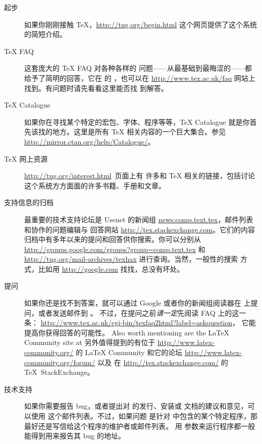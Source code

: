 \documentclass{article}
\begin{document}
\begin{description}
\item [起步] 如果你刚刚接触 \TeX，\url{http://tug.org/begin.html}
这个网页提供了这个系统的简短介绍。

\item [\TeX{} FAQ] 这套庞大的 \TeX{} FAQ 对各种各样的
问题——从最基础到最晦涩的——都给予了简明的回答，它在 \TL{} 的
，也可以在
\url{http://www.tex.ac.uk/faq} 网站上找到。有问题时请先看看这里能否找
到解答。

\item [\TeX{} Catalogue] 如果你在寻找某个特定的宏包、字体、程序等等，\TeX{}
Catalogue 就是你首先该找的地方。这里是所有 \TeX{} 相关内容的一个巨大集合。参见
\url{http://mirror.ctan.org/help/Catalogue/}。

\item [\TeX{} 网上资源] \url{http://tug.org/interest.html}~页面上有
许多和 \TeX{} 相关的链接，包括讨论这个系统方方面面的许多书籍、手册和文章。

\item [支持信息的归档] 最重要的技术支持论坛是 Usenet 的新闻组
\url{news:comp.text.tex}，邮件列表  和协作的问题编辑与
回答网站 \url{http://tex.stackexchange.com}。它们的内容
归档中有多年以来的提问和回答供你搜索。你可以分别从 \\
\url{http://groups.google.com/groups?group=comp.text.tex} 和 \\
\url{http://tug.org/mail-archives/texhax} 进行查询。当然，一般性的搜索
方式，比如用 \url{http://google.com} 找找，总没有坏处。

\item [提问] 如果你还是找不到答案，就可以通过 Google 或者你的新闻组阅读器在
 上提问，或者发送邮件到 。
不过，在提问之前\emph{请一定}先阅读 FAQ 上的这一条：
\url{http://www.tex.ac.uk/cgi-bin/texfaq2html?label=askquestion}，
它能提高你获得回答的可能性。
Also worth mentioning are the \LaTeX{} Community site at
另外值得提到的有位于 \url{http://www.latex-community.org/} 的
\LaTeX{} Community 和它的论坛
\url{http://www.latex-community.org/forum/} 以及
在 \url{http://tex.stackexchange.com/} 的 \TeX\ StackExchange。

\item [\TL{} 技术支持] 如果你需要报告 bug，或者提出对 \TL{} 的发行、安装或
文档的建议和意见，可以使用  这个邮件列表。不过，如果问题
是针对 \TL{} 中包含的某个特定程序，那最好还是写信给这个程序的维护者或邮件列表。
用  参数来运行程序都一般能得到用来报告其 bug 的地址。

\end{description}
\end{document}
